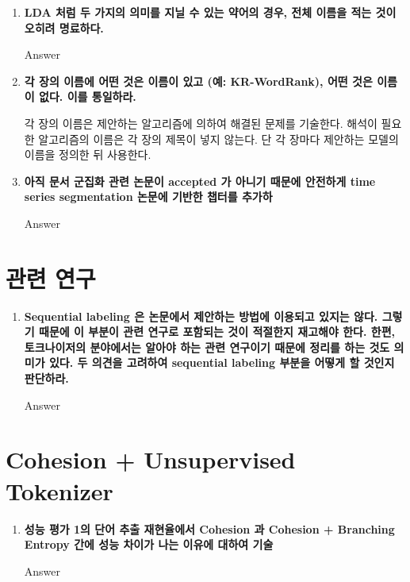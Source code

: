 \documentclass[11pt]{article}
\begin{document}
\begin{enumerate}
\item \textbf{LDA 처럼 두 가지의 의미를 지닐 수 있는 약어의 경우, 전체 이름을 적는 것이 오히려 명료하다.}

Answer

\item \textbf{각 장의 이름에 어떤 것은 이름이 있고 (예: KR-WordRank), 어떤 것은 이름이 없다. 이를 통일하라.}

각 장의 이름은 제안하는 알고리즘에 의하여 해결된 문제를 기술한다. 해석이 필요한 알고리즘의 이름은 각 장의 제목이 넣지 않는다. 단 각 장마다 제안하는 모델의 이름을 정의한 뒤 사용한다.


\item \textbf{아직 문서 군집화 관련 논문이 accepted 가 아니기 때문에 안전하게 time series segmentation 논문에 기반한 챕터를 추가하}

Answer


\end{enumerate}



\section{관련 연구}
\begin{enumerate}
\item \textbf{Sequential labeling 은 논문에서 제안하는 방법에 이용되고 있지는 않다. 그렇기 때문에 이 부분이 관련 연구로 포함되는 것이 적절한지 재고해야 한다. 한편, 토크나이저의 분야에서는 알아야 하는 관련 연구이기 때문에 정리를 하는 것도 의미가 있다. 두 의견을 고려하여 sequential labeling 부분을 어떻게 할 것인지 판단하라.}

Answer

\end{enumerate}



\section{Cohesion + Unsupervised Tokenizer}
\begin{enumerate}
\item \textbf{성능 평가 1의 단어 추출 재현율에서 Cohesion 과 Cohesion + Branching Entropy 간에 성능 차이가 나는 이유에 대하여 기술}

Answer

\end{enumerate}
\end{document}
